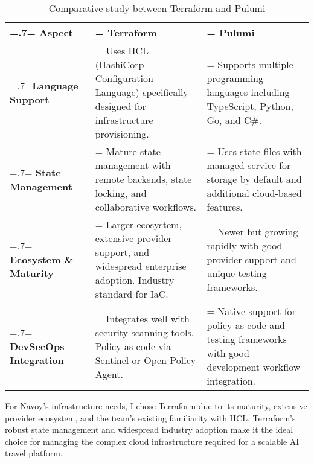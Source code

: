 \begin{table}[H]
    \renewcommand{\arraystretch}{1.5}%
    \caption{Comparative study between Terraform and Pulumi}
    \centering
    \medskip
    \begin{tabularx}{1\textwidth} {
            | >{\hsize=.7\hsize\linewidth=\hsize\centering\arraybackslash}X
            | >{\hsize=1.15\hsize\linewidth=\hsize\justifying\arraybackslash}X
            | >{\hsize=1.15\hsize\linewidth=\hsize\justifying\arraybackslash}X |}
        \hline
        \rowcolor{primary} \textbf {Aspect} & \textbf {Terraform}                                                                                                    & \textbf {Pulumi}                                                                                               \\
        \hline
        \textbf {Language Support}          & \noindent Uses HCL (HashiCorp Configuration Language) specifically designed for infrastructure provisioning.           & \noindent Supports multiple programming languages including TypeScript, Python, Go, and C\#.                   \\
        \hline
        \textbf {State Management}          & \noindent Mature state management with remote backends, state locking, and collaborative workflows.                    & \noindent Uses state files with managed service for storage by default and additional cloud-based features.    \\
        \hline
        \textbf {Ecosystem \& Maturity}     & \noindent Larger ecosystem, extensive provider support, and widespread enterprise adoption. Industry standard for IaC. & \noindent Newer but growing rapidly with good provider support and unique testing frameworks.                  \\
        \hline
        \textbf {DevSecOps Integration}     & \noindent Integrates well with security scanning tools. Policy as code via Sentinel or Open Policy Agent.              & \noindent Native support for policy as code and testing frameworks with good development workflow integration. \\
        \hline
    \end{tabularx}
\end{table}

For Navoy's infrastructure needs, I chose Terraform due to its maturity, extensive provider ecosystem, and the team's existing familiarity with HCL. Terraform's robust state management and widespread industry adoption make it the ideal choice for managing the complex cloud infrastructure required for a scalable AI travel platform.

